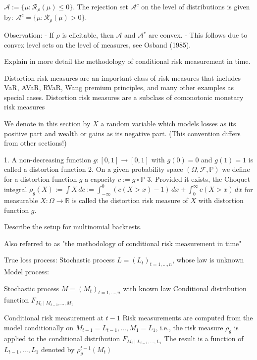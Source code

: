 \(
\mathcal{A} := \{\mu : \mathcal{R}_{\rho}(\mu) \leq 0\}.
\)
The rejection set \(\mathcal{A}^c\) on the level of distributions is given by:
\(
\mathcal{A}^c = \{\mu : \mathcal{R}_{\rho}(\mu) > 0\}.
\)

Observation:
- If \(\rho\) is elicitable, then \(\mathcal{A}\) and \(\mathcal{A}^c\) are convex.
- This follows due to convex level sets on the level of measures, see Osband (1985).

Explain in more detail the methodology of conditional risk measurement in time.

Distortion risk measures are an important class of risk measures that includes VaR, AVaR, RVaR, Wang premium principles, and many other examples as special cases.
Distortion risk measures are a subclass of comonotonic monetary risk measures

We denote in this section by \(X\) a random variable which models losses as its positive part and wealth or gains as its negative part. 
(This convention differs from other sections!)

1. A non-decreasing function \(g : [0, 1] \to [0, 1]\) with \(g(0) = 0\) and \(g(1) = 1\) is called a distortion function
2. On a given probability space \((\Omega, \mathcal{F}, \mathbb{P})\) we define for a distortion function \(g\) a capacity \(c := g \circ \mathbb{P}\)
3. Provided it exists, the Choquet integral
\(
\rho_g(X) := \int X \, dc := \int_{-\infty}^0 (c(X > x) - 1) \, dx + \int_0^{\infty} c(X > x) \, dx
\)
for measurable \(X : \Omega \to \mathbb{R}\) is called the distortion risk measure of \(X\) with distortion function \(g\).


Describe the setup for multinomial backtests.


Also referred to as
"the methodology of conditional risk measurement in time"

True loss process:
Stochastic process \(L = (L_t)_{t=1, \ldots, n}\), whose law is unknown
Model process:

Stochastic process \(M = (M_t)_{t=1, \ldots, n}\) with known law
Conditional distribution function \(F_{M_t \mid M_{t-1}, \ldots, M_1}\)

Conditional risk measurement at \(t-1\)
Risk measurements are computed from the model conditionally on \(M_{t-1} = L_{t-1}, \ldots, M_1 = L_1\), i.e., 
the risk measure \(\rho_g\) is applied to the conditional distribution \(F_{M_t \mid L_{t-1}, \ldots, L_1}\)
The result is a function of \(L_{t-1}, \ldots, L_1\) denoted by \(\rho_g^{t-1}(M_t)\)


